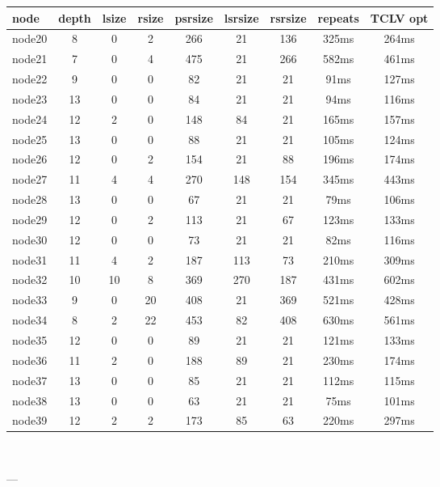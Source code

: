 \begin{tabular}{|l|c|c|c|c|c|c|c|c|}
\hline node & depth & lsize & rsize & psrsize & lsrsize & rsrsize   & repeats & TCLV opt\\
    \hline node20 & 8 & 0 & 2 & 266 & 21 & 136 & 325ms & 264ms\\
    \hline node21 & 7 & 0 & 4 & 475 & 21 & 266 & 582ms & 461ms\\
    \hline node22 & 9 & 0 & 0 & 82 & 21 & 21 & 91ms & 127ms\\
    \hline node23 & 13 & 0 & 0 & 84 & 21 & 21 & 94ms & 116ms\\
    \hline node24 & 12 & 2 & 0 & 148 & 84 & 21 & 165ms & 157ms\\
    \hline node25 & 13 & 0 & 0 & 88 & 21 & 21 & 105ms & 124ms\\
    \hline node26 & 12 & 0 & 2 & 154 & 21 & 88 & 196ms & 174ms\\
    \hline node27 & 11 & 4 & 4 & 270 & 148 & 154 & 345ms & 443ms\\
    \hline node28 & 13 & 0 & 0 & 67 & 21 & 21 & 79ms & 106ms\\
    \hline node29 & 12 & 0 & 2 & 113 & 21 & 67 & 123ms & 133ms\\
    \hline node30 & 12 & 0 & 0 & 73 & 21 & 21 & 82ms & 116ms\\
    \hline node31 & 11 & 4 & 2 & 187 & 113 & 73 & 210ms & 309ms\\
    \hline node32 & 10 & 10 & 8 & 369 & 270 & 187 & 431ms & 602ms\\
    \hline node33 & 9 & 0 & 20 & 408 & 21 & 369 & 521ms & 428ms\\
    \hline node34 & 8 & 2 & 22 & 453 & 82 & 408 & 630ms & 561ms\\
    \hline node35 & 12 & 0 & 0 & 89 & 21 & 21 & 121ms & 133ms\\
    \hline node36 & 11 & 2 & 0 & 188 & 89 & 21 & 230ms & 174ms\\
    \hline node37 & 13 & 0 & 0 & 85 & 21 & 21 & 112ms & 115ms\\
    \hline node38 & 13 & 0 & 0 & 63 & 21 & 21 & 75ms & 101ms\\
    \hline node39 & 12 & 2 & 2 & 173 & 85 & 63 & 220ms & 297ms\\

\hline
\end{tabular} \

---


